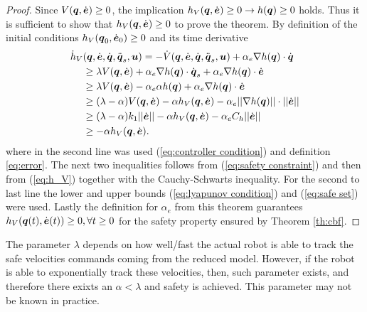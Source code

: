 \begin{proof}
    Since $V({\boldsymbol{q}},\dot{\boldsymbol{e}}) \geq 0$, the implication $h_V({\boldsymbol{q}},\dot{\boldsymbol{e}}) \geq 0 \rightarrow h({\boldsymbol{q}}) \geq 0$ holds. Thus it is sufficient to show that $h_V({\boldsymbol{q}},\dot{\boldsymbol{e}}) \geq 0$ to prove the theorem. By definition of the initial conditions $h_V({\boldsymbol{q}}_0,\dot{\boldsymbol{e}}_0) \geq 0$ and its time derivative
    \begin{equation*}
        \begin{split}
            \dot{h}_V&({\boldsymbol{q}},\dot{\boldsymbol{e}},\dot{{\boldsymbol{q}}},\ddot{{\boldsymbol{q}}}_s,\boldsymbol{u}) = -\dot{V}({\boldsymbol{q}},\dot{\boldsymbol{e}},\dot{{\boldsymbol{q}}},\ddot{{\boldsymbol{q}}}_s,\boldsymbol{u}) + \alpha_e \nabla h({\boldsymbol{q}})\cdot\dot{{\boldsymbol{q}}} \\
            & \geq \lambda V({\boldsymbol{q}},\dot{\boldsymbol{e}}) + \alpha_e \nabla h({\boldsymbol{q}})\cdot\dot{{\boldsymbol{q}}}_s + \alpha_e \nabla h({\boldsymbol{q}})\cdot\dot{\boldsymbol{e}} \\
            & \geq \lambda V({\boldsymbol{q}},\dot{\boldsymbol{e}})  - \alpha_e \alpha h({\boldsymbol{q}}) + \alpha_e \nabla h({\boldsymbol{q}})\cdot\dot{\boldsymbol{e}} \\
            & \geq (\lambda-\alpha) V({\boldsymbol{q}},\dot{\boldsymbol{e}})- \alpha h_V({\boldsymbol{q}},\dot{\boldsymbol{e}}) - \alpha_e ||\nabla h({\boldsymbol{q}})||\cdot||\dot{\boldsymbol{e}}||  \\
            & \geq (\lambda-\alpha) k_1 ||\dot{\boldsymbol{e}}|| - \alpha h_V({\boldsymbol{q}},\dot{\boldsymbol{e}}) - \alpha_e C_h ||\dot{\boldsymbol{e}}|| \\
            & \geq - \alpha h_V({\boldsymbol{q}},\dot{\boldsymbol{e}}).
        \end{split}
    \end{equation*}
    where in the second line was used (\ref{eq:controller condition}) and definition \eqref{eq:error}. The next two inequalities follows from (\ref{eq:safety constraint}) and then from (\ref{eq:h_V}) together with the Cauchy-Schwarts inequality. For the second to last line the lower and upper bounds (\ref{eq:lyapunov condition}) and (\ref{eq:safe set}) were used. Lastly the definition for $\alpha_e$ from this theorem guarantees $h_V({\boldsymbol{q}}(t),\dot{\boldsymbol{e}}(t)) \geq 0, \forall t \geq 0$ for the safety property ensured by Theorem \ref{th:cbf}.
\end{proof}
\noindent
The parameter $\lambda$ depends on how well/fast the actual robot is able to track the safe velocities commands coming from the reduced model. However, if the robot is able to exponentially track these velocities, then, such parameter exists, and therefore there exixts an $\alpha <\lambda$ and safety is achieved. This parameter may not be known in practice.\\ 

